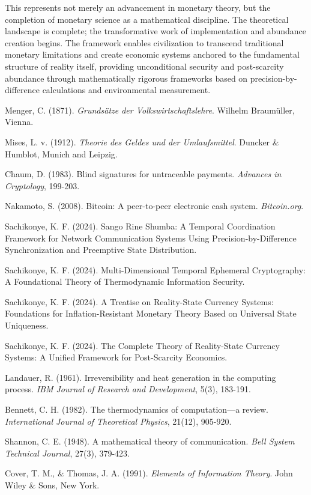 \documentclass[12pt,a4paper]{article}
\begin{document}
This represents not merely an advancement in monetary theory, but the completion of monetary science as a mathematical discipline. The theoretical landscape is complete; the transformative work of implementation and abundance creation begins. The framework enables civilization to transcend traditional monetary limitations and create economic systems anchored to the fundamental structure of reality itself, providing unconditional security and post-scarcity abundance through mathematically rigorous frameworks based on precision-by-difference calculations and environmental measurement.


\begin{thebibliography}{99}

 Menger, C. (1871). \textit{Grundsätze der Volkswirtschaftslehre}. Wilhelm Braumüller, Vienna.

 Mises, L. v. (1912). \textit{Theorie des Geldes und der Umlaufsmittel}. Duncker \& Humblot, Munich and Leipzig.

 Chaum, D. (1983). Blind signatures for untraceable payments. \textit{Advances in Cryptology}, 199-203.

 Nakamoto, S. (2008). Bitcoin: A peer-to-peer electronic cash system. \textit{Bitcoin.org}.

 Sachikonye, K. F. (2024). Sango Rine Shumba: A Temporal Coordination Framework for Network Communication Systems Using Precision-by-Difference Synchronization and Preemptive State Distribution.

 Sachikonye, K. F. (2024). Multi-Dimensional Temporal Ephemeral Cryptography: A Foundational Theory of Thermodynamic Information Security.

 Sachikonye, K. F. (2024). A Treatise on Reality-State Currency Systems: Foundations for Inflation-Resistant Monetary Theory Based on Universal State Uniqueness.

 Sachikonye, K. F. (2024). The Complete Theory of Reality-State Currency Systems: A Unified Framework for Post-Scarcity Economics.

 Landauer, R. (1961). Irreversibility and heat generation in the computing process. \textit{IBM Journal of Research and Development}, 5(3), 183-191.

 Bennett, C. H. (1982). The thermodynamics of computation—a review. \textit{International Journal of Theoretical Physics}, 21(12), 905-920.

 Shannon, C. E. (1948). A mathematical theory of communication. \textit{Bell System Technical Journal}, 27(3), 379-423.

 Cover, T. M., \& Thomas, J. A. (1991). \textit{Elements of Information Theory}. John Wiley \& Sons, New York.

\end{thebibliography}
\end{document}
